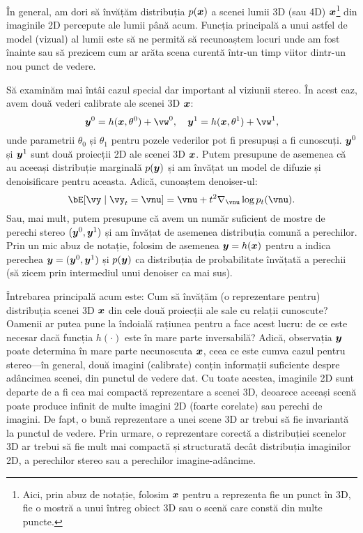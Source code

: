 \documentclass[../../book-main_ro.tex]{subfiles}
\begin{document}
În general, am dori să învățăm distribuția $p(\bm{x})$ a scenei lumii 3D (sau 4D) $\bm{x}$\footnote{Aici, prin abuz de notație, folosim $\bm{x}$ pentru a reprezenta fie un punct în 3D, fie o mostră a unui întreg obiect 3D sau o scenă care constă din multe puncte.} din imaginile 2D percepute ale lumii până acum. Funcția principală a unui astfel de model (vizual) al lumii este să ne permită să recunoaștem locuri unde am fost înainte sau să prezicem cum ar arăta scena curentă într-un timp viitor dintr-un nou punct de vedere.

Să examinăm mai întâi cazul special dar important al viziunii stereo. În acest caz, avem două vederi calibrate ale scenei 3D $\bm{x}$:
\begin{equation}
    \y^0 = h(\x, \theta^0) +\vw^0, \quad \y^1 = h(\x, \theta^1) +\vw^1, 
\end{equation}
unde parametrii $\theta_0$ și $\theta_1$ pentru pozele vederilor pot fi presupuși a fi cunoscuți. $\bm{y}^0$ și $\bm{y}^1$ sunt două proiecții 2D ale scenei 3D $\bm{x}$. Putem presupune de asemenea că au aceeași distribuție marginală $p(\bm{y})$ și am învățat un model de difuzie și denoisificare pentru aceasta. Adică, cunoaștem denoiser-ul:
\begin{equation}
  \bE[\vy \mid \vy_t=\vnu] =
  \vnu + t^2 \nabla_{\vnu}\log p_t(\vnu). 
 \label{eq:y-posterior-sampling-denoiser}    
\end{equation}
Sau, mai mult, putem presupune că avem un număr suficient de mostre de perechi stereo $(\bm{y}^0, \bm{y}^1)$ și am învățat de asemenea distribuția comună a perechilor. Prin un mic abuz de notație, folosim de asemenea $\bm{y} = h(\bm{x})$ pentru a indica perechea $\bm{y} = (\bm{y}^0, \bm{y}^1)$ și $p(\bm{y})$ ca distribuția de probabilitate învățată a perechii (să zicem prin intermediul unui denoiser ca mai sus).

Întrebarea principală acum este: Cum să învățăm (o reprezentare pentru) distribuția scenei 3D $\bm{x}$ din cele două proiecții ale sale cu relații cunoscute?
Oamenii ar putea pune la îndoială rațiunea pentru a face acest lucru: de ce este necesar dacă funcția $h(\cdot)$ este în mare parte inversabilă? Adică, observația $\bm{y}$ poate determina în mare parte necunoscuta $\bm{x}$, ceea ce este cumva cazul pentru stereo—în general, două imagini (calibrate) conțin informații suficiente despre adâncimea scenei, din punctul de vedere dat. Cu toate acestea, imaginile 2D sunt departe de a fi cea mai compactă reprezentare a scenei 3D, deoarece aceeași scenă poate produce infinit de multe imagini 2D (foarte corelate) sau perechi de imagini. De fapt, o bună reprezentare a unei scene 3D ar trebui să fie invariantă la punctul de vedere. Prin urmare, o reprezentare corectă a distribuției scenelor 3D ar trebui să fie mult mai compactă și structurată decât distribuția imaginilor 2D, a perechilor stereo sau a perechilor imagine-adâncime.
\end{document}
